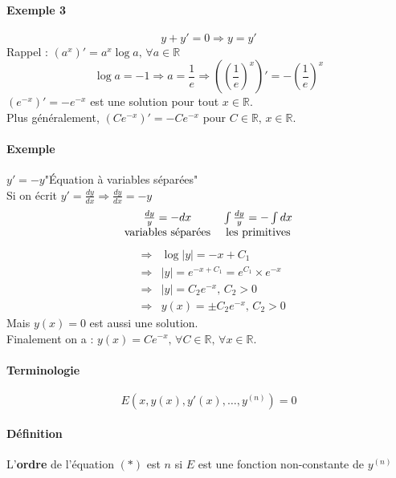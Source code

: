 \documentclass[1Opt]{report}
\begin{document}
\paragraph{Exemple 3}
\[y+y'=0\Rightarrow y=y'\]
Rappel : $(a^x)'=a^x\log{a}, \, \forall a\in{\mathbb R}$
\[\log{a}=-1\Rightarrow a=\frac{1}{e}\Rightarrow \left(\left(\frac{1}{e}\right)^x\right)'=-\left(\frac{1}{e}\right)^x\]
$(e^{-x})'=-e^{-x}$ est une solution pour tout $x\in{\mathbb R}$.\\
Plus généralement, $(Ce^{-x})'=-Ce^{-x}$ pour $C\in{\mathbb R},\,x\in{\mathbb R}$.

\paragraph{Exemple}
$y'=-y$\quad "Équation à variables séparées" \\
Si on écrit $y'=\frac{dy}{dx}\Rightarrow\frac{dy}{dx}=-y$
\begin{eqnarray*}
  \begin{tabular}{c c}
    $\frac{dy}{y}=-dx$ & $\int{\frac{dy}{y}}=-\int{dx}$ \\
    variables séparées & les primitives
  \end{tabular}
\end{eqnarray*}
\begin{eqnarray*}
  & \Rightarrow & \log{|y|}=-x+C_1 \\
  & \Rightarrow & |y|=e^{-x+C_1}=e^{C_1}\times e^{-x}\\
  & \Rightarrow & |y|=C_2e^{-x},\, C_2>0\\
  & \Rightarrow & y(x)=\pm C_2e^{-x},\, C_2>0
\end{eqnarray*}
Mais $y(x)=0$ est aussi une solution.\\
Finalement on a : $y(x)=Ce^{-x},\,\forall C\in{\mathbb R},\,\forall x\in{\mathbb R}$.

\paragraph{Terminologie}
\begin{equation*}
  E\left(x,y(x),y'(x),\ldots,y^{(n)}\right)=0 \tag{$\ast$}
\end{equation*}

\paragraph{Définition}
L'\textbf{ordre} de l'équation $(\ast)$ est $n$ si $E$ est une fonction non-constante
de $y^{(n)}$
\end{document}
